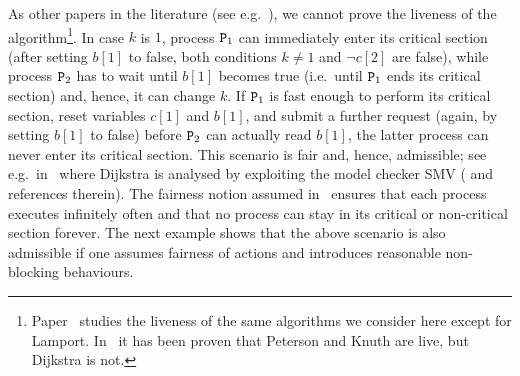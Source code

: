 \documentclass[copyright,creativecommons]{eptcs}
\newcommand{\proc}{{\tt P}}
\begin{document}
As other papers in the literature (see e.g.~\cite{Bogunovic03}), we cannot
prove the liveness of the algorithm\footnote{Paper~\cite{Bogunovic03}
studies the liveness of the same algorithms we consider here except for
Lamport. In~\cite{Bogunovic03} it has been proven that Peterson and Knuth
are live, but Dijkstra is not.}. 
In case $k$ is  $1$, process $\proc_1$ can immediately enter its critical
section (after setting $b[1]$ to false, both conditions $k \neq 1$ and
$\neg c[2]$ are false), while process $\proc_2$ has to wait until $b[1]$
becomes true (i.e.\ until $\proc_1$ ends its critical section) and, hence,
it can change $k$. If $\proc_1$ is fast enough to perform its critical
section, reset variables $c[1]$ and $b[1]$, and submit a further request
(again, by setting $b[1]$ to false) before $\proc_2$ can actually read
$b[1]$, the latter process can never enter its critical section. This
scenario is fair and, hence, admissible; see e.g.\ in~\cite{Bogunovic03}
where Dijkstra is analysed by exploiting the model checker SMV
(\cite{Bogunovic03} and references therein). The fairness notion assumed
in~\cite{Bogunovic03} ensures that each process executes infinitely often
and that no process can stay in its critical or non-critical section
forever. The next example shows that the above scenario is also admissible
if one assumes fairness of actions and introduces reasonable non-blocking
behaviours.
\end{document}
